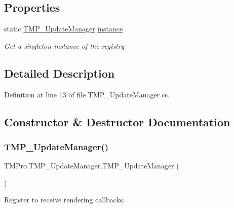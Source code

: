 \subsection*{Properties}
\begin{DoxyCompactItemize}
\item 
static \mbox{\hyperlink{class_t_m_pro_1_1_t_m_p___update_manager}{T\+M\+P\+\_\+\+Update\+Manager}} \mbox{\hyperlink{class_t_m_pro_1_1_t_m_p___update_manager_aec0eecf598f0d3eb8e682f0ec6f18f1f}{instance}}
\begin{DoxyCompactList}\small\item\em Get a singleton instance of the registry \end{DoxyCompactList}\end{DoxyCompactItemize}


\subsection{Detailed Description}


Definition at line 13 of file T\+M\+P\+\_\+\+Update\+Manager.\+cs.



\subsection{Constructor \& Destructor Documentation}
\mbox{\label{class_t_m_pro_1_1_t_m_p___update_manager_aac91ee76bdd5a4fe9e77536d51a644b8}} 
\subsubsection{\texorpdfstring{TMP\_UpdateManager()}{TMP\_UpdateManager()}}
{\footnotesize\ttfamily T\+M\+Pro.\+T\+M\+P\+\_\+\+Update\+Manager.\+T\+M\+P\+\_\+\+Update\+Manager (\begin{DoxyParamCaption}{ }\end{DoxyParamCaption})\hspace{0.3cm}{\ttfamily [protected]}}



Register to receive rendering callbacks. 



